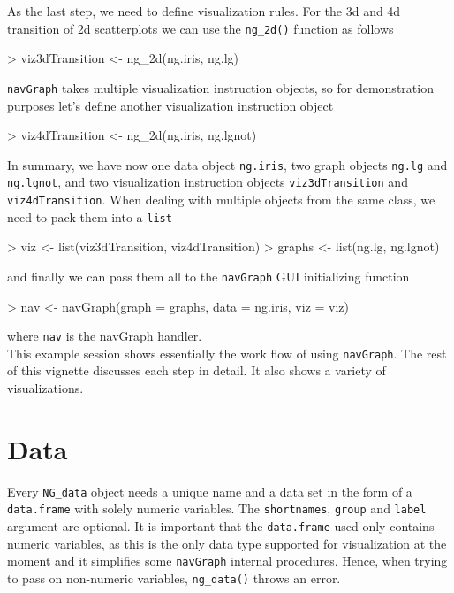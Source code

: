 \documentclass[12pt,oneside,titlepage,letter]{article}
\begin{document}
As the last step, we need to define visualization rules. For the 3d and 4d transition of 2d scatterplots we can use the \texttt{ng\_2d()} function as follows
\begin{Schunk}
\begin{Sinput}
> viz3dTransition <- ng_2d(ng.iris, ng.lg)
\end{Sinput}
\end{Schunk}
\texttt{navGraph} takes multiple visualization instruction objects, so for demonstration purposes let's define another visualization instruction object
\begin{Schunk}
\begin{Sinput}
> viz4dTransition <- ng_2d(ng.iris, ng.lgnot)
\end{Sinput}
\end{Schunk}
In summary, we have now one data object \texttt{ng.iris}, two graph objects \texttt{ng.lg} and \texttt{ng.lgnot}, and two visualization instruction objects \texttt{viz3dTransition} and \texttt{viz4dTransition}. When dealing with multiple objects from the same class, we need to pack them into a \texttt{list}
\begin{Schunk}
\begin{Sinput}
> viz <- list(viz3dTransition, viz4dTransition)
> graphs <- list(ng.lg, ng.lgnot)
\end{Sinput}
\end{Schunk}
and finally we can pass them all to the \texttt{navGraph} GUI initializing function
\begin{Schunk}
\begin{Sinput}
> nav <- navGraph(graph = graphs, data = ng.iris, viz = viz)
\end{Sinput}
\end{Schunk}
where \texttt{nav} is the navGraph handler.\\

This example session shows essentially the work flow of using \texttt{navGraph}. The rest of this vignette discusses each step in detail.  It also shows a variety of visualizations.

\section{Data}
Every \texttt{NG\_data} object needs a unique name and a data set in the form of a \texttt{data.frame} with solely numeric variables. The \texttt{shortnames}, \texttt{group} and \texttt{label} argument are optional. It is important that the \texttt{data.frame} used only contains numeric variables, as this is the only data type supported for visualization at the moment and it simplifies some \texttt{navGraph} internal procedures. Hence, when trying to pass on non-numeric variables, \texttt{ng\_data()} throws an error.\\
\end{document}
